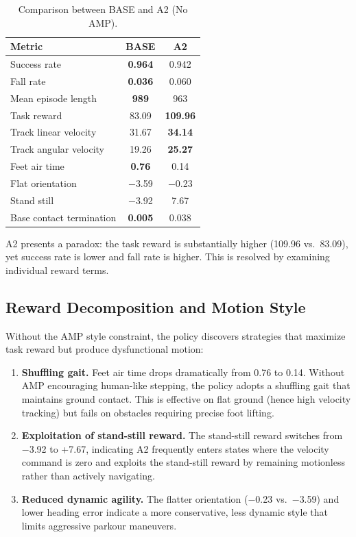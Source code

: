 \begin{table}[t]
\centering
\caption{Comparison between BASE and A2 (No AMP).}
\label{tab:a2_results}
\begin{tabular}{lcc}
\toprule
\textbf{Metric} & \textbf{BASE} & \textbf{A2} \\
\midrule
Success rate & \textbf{0.964} & 0.942 \\
Fall rate & \textbf{0.036} & 0.060 \\
Mean episode length & \textbf{989} & 963 \\
Task reward & 83.09 & \textbf{109.96} \\
Track linear velocity & 31.67 & \textbf{34.14} \\
Track angular velocity & 19.26 & \textbf{25.27} \\
Feet air time & \textbf{0.76} & 0.14 \\
Flat orientation & $-$3.59 & $-$0.23 \\
Stand still & $-$3.92 & 7.67 \\
Base contact termination & \textbf{0.005} & 0.038 \\
\bottomrule
\end{tabular}
\end{table}

A2 presents a paradox: the task reward is substantially higher (109.96 vs.\ 83.09), yet success rate is lower and fall rate is higher. This is resolved by examining individual reward terms.

\subsection{Reward Decomposition and Motion Style}

Without the AMP style constraint, the policy discovers strategies that maximize task reward but produce dysfunctional motion:

\begin{enumerate}
    \item \textbf{Shuffling gait.} Feet air time drops dramatically from 0.76 to 0.14. Without AMP encouraging human-like stepping, the policy adopts a shuffling gait that maintains ground contact. This is effective on flat ground (hence high velocity tracking) but fails on obstacles requiring precise foot lifting.
    \item \textbf{Exploitation of stand-still reward.} The stand-still reward switches from $-$3.92 to +7.67, indicating A2 frequently enters states where the velocity command is zero and exploits the stand-still reward by remaining motionless rather than actively navigating.
    \item \textbf{Reduced dynamic agility.} The flatter orientation ($-$0.23 vs.\ $-$3.59) and lower heading error indicate a more conservative, less dynamic style that limits aggressive parkour maneuvers.
\end{enumerate}

